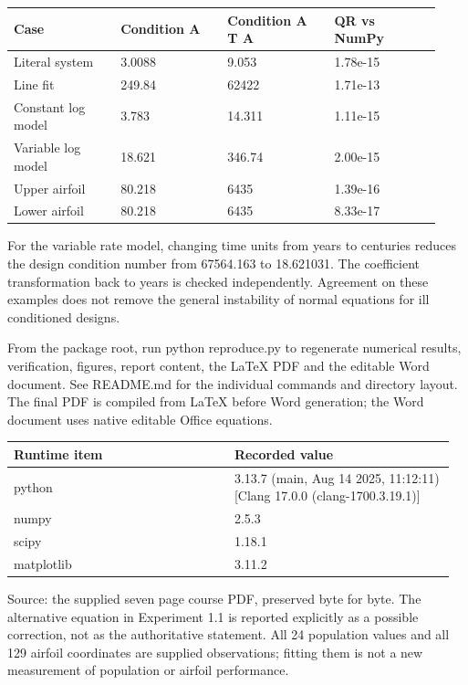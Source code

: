 \documentclass[a4paper,11pt]{article}
\begin{document}
{\small\begin{tabular}{p{0.232\linewidth}p{0.232\linewidth}p{0.232\linewidth}p{0.232\linewidth}}\toprule
Case & Condition A & Condition A T A & QR vs NumPy\\\midrule
Literal system & 3.0088 & 9.053 & 1.78e-15\\
Line fit & 249.84 & 62422 & 1.71e-13\\
Constant log model & 3.783 & 14.311 & 1.11e-15\\
Variable log model & 18.621 & 346.74 & 2.00e-15\\
Upper airfoil & 80.218 & 6435 & 1.39e-16\\
Lower airfoil & 80.218 & 6435 & 8.33e-17\\
\bottomrule\end{tabular}}\par
For the variable rate model, changing time units from years to centuries reduces the design condition number from 67564.163 to 18.621031. The coefficient transformation back to years is checked independently. Agreement on these examples does not remove the general instability of normal equations for ill conditioned designs.

From the package root, run python reproduce.py to regenerate numerical results, verification, figures, report content, the LaTeX PDF and the editable Word document. See README.md for the individual commands and directory layout. The final PDF is compiled from LaTeX before Word generation; the Word document uses native editable Office equations.

{\small\begin{tabular}{p{0.482\linewidth}p{0.482\linewidth}}\toprule
Runtime item & Recorded value\\\midrule
python & 3.13.7 (main, Aug 14 2025, 11:12:11) [Clang 17.0.0 (clang-1700.3.19.1)]\\
numpy & 2.5.3\\
scipy & 1.18.1\\
matplotlib & 3.11.2\\
\bottomrule\end{tabular}}\par
Source: the supplied seven page course PDF, preserved byte for byte. The alternative equation in Experiment 1.1 is reported explicitly as a possible correction, not as the authoritative statement. All 24 population values and all 129 airfoil coordinates are supplied observations; fitting them is not a new measurement of population or airfoil performance.
\end{document}
